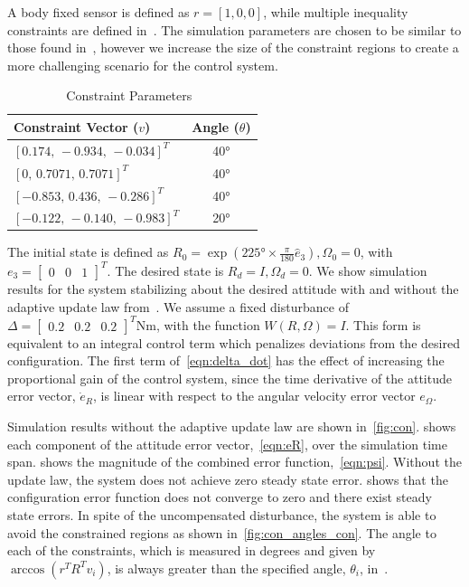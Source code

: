 A body fixed sensor is defined as \(r = [1,0,0]\), while multiple inequality constraints are defined in~.
The simulation parameters are chosen to be similar to those found in~\cite{lee2011b}, however we increase the size of the constraint regions to create a more challenging scenario for the control system.
\vspace{-2.5mm}
\begin{table}[H]
\caption{Constraint Parameters~\label{tab:constraints}}
\begin{center}\begin{tabular}{lc}
Constraint Vector (\( v \)) & Angle (\( \theta \)) \\ \hline \hline 
\([0.174,\,-0.934,\, -0.034]^T\) & \ang{40} \\ \hline 
\([0 ,\, 0.7071 ,\, 0.7071]^T\) & \ang{40} \\ \hline 
\([-0.853 ,\, 0.436 ,\, -0.286]^T\) & \ang{40} \\ \hline 
\([-0.122 ,\,-0.140,\, -0.983]^T\) & \ang{20}\end{tabular} 
\end{center}
\end{table}
\vspace{-2.5mm}
The initial state is defined as \(R_0 =  \exp(\ang{225} \times \frac{\pi}{180} \hat{e}_3), \Omega_0 = 0\), with \( e_3 = \begin{bmatrix} 0 & 0 & 1 \end{bmatrix}^T \).
The desired state is \( R_d = I,\Omega_d = 0\).
We show simulation results for the system stabilizing about the desired attitude with and without the adaptive update law from~.
We assume a fixed disturbance of \(\Delta = \begin{bmatrix} 0.2 & 0.2 & 0.2 \end{bmatrix}^T \si{\newton\meter}\), with the function \( W(R,\Omega) = I \).
This form is equivalent to an integral control term which penalizes deviations from the desired configuration.
The first term of~\cref{eqn:delta_dot} has the effect of increasing the proportional gain of the control system, since the time derivative of the attitude error vector, \( \dot{e}_{R} \), is linear with respect to the angular velocity error vector \( e_\Omega\).

Simulation results without the adaptive update law are shown in~\cref{fig:con}.
 shows each component of the attitude error vector,~\cref{eqn:eR}, over the simulation time span.
 shows the  magnitude of the combined error function,~\cref{eqn:psi}.
Without the update law, the system does not achieve zero steady state error. 
 shows that the configuration error function does not converge to zero and there exist steady state errors.
In spite of the uncompensated disturbance, the system is able to avoid the constrained regions as shown in~\cref{fig:con_angles_con}.
The angle to each of the constraints, which is measured in degrees and given by \( \arccos(r^T R^T v_i) \), is always greater than the specified angle, \( \theta_i \), in~.

